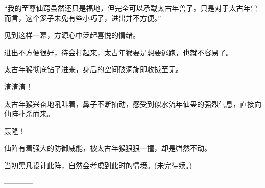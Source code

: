 \begin{this_body}
“我的至尊仙窍虽然还只是福地，但完全可以承载太古年兽了。只是对于太古年兽而言，这个笼子未免有些小巧了，进出并不方便。”

见到这样一幕，方源心中泛起喜悦的情绪。

进出不方便很好，待会打起来，太古年猴要是想要逃跑，也就不容易了。

太古年猴彻底钻了进来，身后的空间破洞旋即收拢至无。

渣渣渣！

太古年猴兴奋地吼叫着，鼻子不断抽动，感受到似水流年仙蛊的强烈气息，直接向仙阵扑杀而来。

轰隆！

仙阵有着强大的防御威能，被太古年猴狠狠一撞，却是岿然不动。

当初黑凡设计此阵，自然会考虑到此时的情境。(未完待续。)

------------

\end{this_body}

